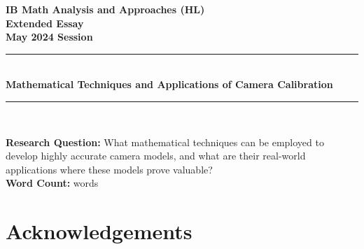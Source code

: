 \documentclass[12pt, oneside]{article}
\providecommand{\totalwordcount}{}
\begin{document}
\pagestyle{frontmatter}

\begin{titlepage}
    \large

    \begin{center}

        \vspace*{2cm}

        {\bfseries
            IB Math Analysis and Approaches (HL) \\
            Extended Essay\\
            May 2024 Session}\\

        \vspace*{\fill}

        \rule{\linewidth}{1.5pt} \\ [0.5cm]
        {\LARGE \bfseries Mathematical Techniques and Applications of Camera Calibration }
        \rule{\linewidth}{0.5pt} \\

        \vspace*{\fill}

        \textbf{Research Question:} What mathematical techniques can be employed to develop highly accurate camera models, and what are their real-world applications where these models prove valuable? \\ [1cm]

        \textbf{Word Count:} \totalwordcount words

        \vspace*{2cm}

    \end{center}

\end{titlepage}

\tableofcontents
\clearpage
\pagestyle{mainmatter}
\setcounter{page}{1}










\section*{Acknowledgements}
\end{document}
